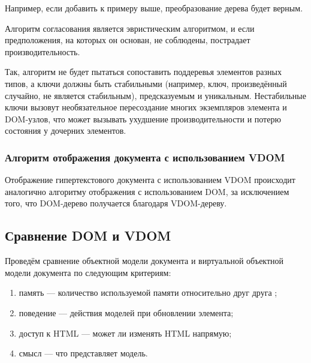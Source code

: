 Например, если добавить  к примеру выше, преобразование дерева будет верным.
\clearpage


Алгоритм согласования является эвристическим \cite{euristic} алгоритмом, и если предположения, на которых он основан, не соблюдены, пострадает производительность.

Так, алгоритм не будет пытаться сопоставить поддеревья элементов разных типов, а ключи должны быть стабильными (например, ключ, произведённый случайно, не является стабильным), предсказуемым и уникальным.
Нестабильные ключи вызовут необязательное пересоздание многих экземпляров элемента и DOM-узлов, что может вызывать ухудшение производительности и потерю состояния у дочерних элементов.
\clearpage

\subsubsection{Алгоритм отображения документа с использованием VDOM}

Отображение гипертекстового документа с использованием VDOM происходит аналогично алгоритму отображения с использованием DOM, за исключением того, что DOM-дерево получается благодаря VDOM-дереву.

\subsection{Сравнение DOM и VDOM}

Проведём сравнение объектной модели документа и виртуальной объектной модели документа по следующим критериям: 
\begin{enumerate}[label=\arabic*)]
	\item память --- количество используемой памяти относительно друг друга ;
	\item поведение --- действия моделей при обновлении элемента;
	\item доступ к HTML --- может ли изменять HTML напрямую;
	\item смысл --- что представляет модель.
\end{enumerate}

